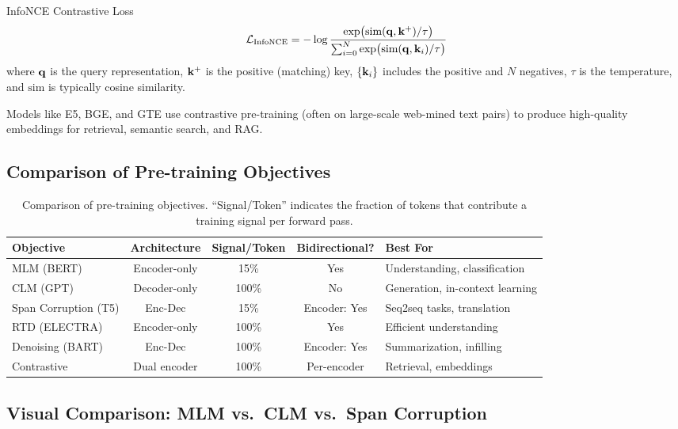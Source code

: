 \begin{mathresult}{InfoNCE Contrastive Loss}
\[
    \mathcal{L}_{\text{InfoNCE}} = -\log \frac{\exp\bigl(\text{sim}(\mathbf{q}, \mathbf{k}^+) / \tau\bigr)}
        {\sum_{i=0}^{N} \exp\bigl(\text{sim}(\mathbf{q}, \mathbf{k}_i) / \tau\bigr)}
\]
where $\mathbf{q}$ is the query representation, $\mathbf{k}^+$ is the positive (matching)
key, $\{\mathbf{k}_i\}$ includes the positive and $N$ negatives, $\tau$ is the
temperature, and $\text{sim}$ is typically cosine similarity.
\end{mathresult}

Models like E5, BGE, and GTE use contrastive pre-training (often on
large-scale web-mined text pairs) to produce high-quality embeddings
for retrieval, semantic search, and RAG.

\subsection{Comparison of Pre-training Objectives}

\begin{table}[H]
\centering
\small
\begin{tabularx}{\textwidth}{@{}l c c c X@{}}
\toprule
\textbf{Objective} & \textbf{Architecture} & \textbf{Signal/Token} & \textbf{Bidirectional?} & \textbf{Best For} \\
\midrule
MLM (BERT)          & Encoder-only   & 15\%   & Yes & Understanding, classification \\
CLM (GPT)           & Decoder-only   & 100\%  & No  & Generation, in-context learning \\
Span Corruption (T5)& Enc-Dec        & 15\%   & Encoder: Yes & Seq2seq tasks, translation \\
RTD (ELECTRA)       & Encoder-only   & 100\%  & Yes & Efficient understanding \\
Denoising (BART)    & Enc-Dec        & 100\%  & Encoder: Yes & Summarization, infilling \\
Contrastive         & Dual encoder   & 100\%  & Per-encoder & Retrieval, embeddings \\
\bottomrule
\end{tabularx}
\caption{Comparison of pre-training objectives.  ``Signal/Token'' indicates the fraction
of tokens that contribute a training signal per forward pass.}
\label{tab:pretraining-objectives}
\end{table}

\subsection{Visual Comparison: MLM vs.\ CLM vs.\ Span Corruption}

